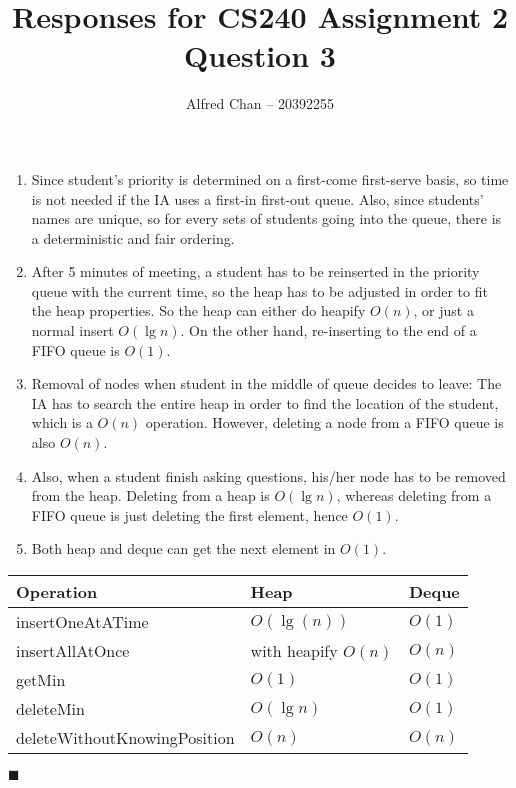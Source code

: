 \documentclass[12pt]{article}
\title{Responses for CS240 Assignment 2 Question 3}
\author{Alfred Chan -- 20392255}
\begin{document}
\maketitle

\begin{enumerate}
\item 
Since student's priority is determined on a first-come first-serve basis, so time is not needed if the IA uses a first-in first-out queue.
Also, since students' names are unique, so for every sets of students going into the queue, there is a deterministic and fair ordering.
\item After 5 minutes of meeting, a student has to be reinserted in the priority queue with the current time, so the heap has to be adjusted in order to fit the heap properties.
So the heap can either do heapify $O(n)$, or just a normal insert $O(\lg n)$.
On the other hand, re-inserting to the end of a FIFO queue is $O(1)$.
\item Removal of nodes when student in the middle of queue decides to leave:
The IA has to search the entire heap in order to find the location of the student, which is a $O(n)$ operation.
However, deleting a node from a FIFO queue is also $O(n)$.
\item Also, when a student finish asking questions, his/her node has to be removed from the heap.
Deleting from a heap is $O(\lg n)$, whereas deleting from a FIFO queue is just deleting the first element, hence $O(1)$.
\item Both heap and deque can get the next element in $O(1)$.
\end{enumerate}

\begin{tabular}{| l | l | l |}
  \hline
	Operation & Heap & Deque\\
  \hline
	insertOneAtATime & $O(\lg(n))$ & $O(1)$\\
	insertAllAtOnce & with heapify $O(n)$ & $O(n)$\\
	getMin & $O(1)$ & $O(1)$\\
	deleteMin & $O(\lg n)$ & $O(1)$\\
	deleteWithoutKnowingPosition & $O(n)$ & $O(n)$\\
  \hline  
\end{tabular}

\hfill $\blacksquare$
\end{document}
